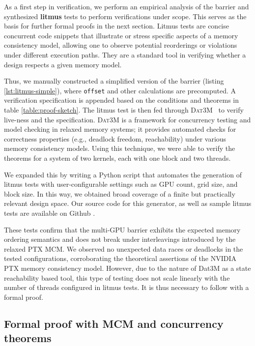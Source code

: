 \documentclass[acmsmall]{acmart}
\begin{document}
As a first step in verification, we perform an empirical analysis of the barrier and synthesized \textbf{litmus} tests to perform verifications under scope. This serves as the basis for further formal proofs in the next section. Litmus tests are concise concurrent code snippets that illustrate or stress specific aspects of a memory consistency model, allowing one to observe potential reorderings or violations under different execution paths. They are a standard tool in verifying whether a design respects a given memory model.

Thus, we manually constructed a simplified version of the barrier (listing \ref{lst:litmus-simple}), where \texttt{offset} and other calculations are precomputed. A verification specification is appended based on the conditions and theorems in table  \ref{table:proof-sketch}. The litmus test is then fed through \textsc{Dat3M}~\cite{unified-analysis} to verify live-ness and the specification. \textsc{Dat3M} is a framework for concurrency testing and model checking in relaxed memory systems; it provides automated checks for correctness properties (e.g., deadlock freedom, reachability) under various memory consistency models. Using this technique, we were able to verify the theorems for a system of two kernels, each with one block and two threads.

We expanded this by writing a Python script that automates the generation of litmus tests with user-configurable settings such as GPU count, grid size, and block size. In this way, we obtained broad coverage of a finite but practically relevant design space. Our source code for this generator, as well as sample litmus tests are available on Github \cite{gpubar}.

These tests confirm that the multi-GPU barrier exhibits the expected memory ordering semantics and does not break under interleavings introduced by the relaxed PTX MCM. We observed no unexpected data races or deadlocks in the tested configurations, corroborating the theoretical assertions of the NVIDIA PTX memory consistency model. However, due to the nature of Dat3M as a state reachability based tool, this type of testing does not scale linearly with the number of threads configured in litmus tests. It is thus necessary to follow with a formal proof.   

\subsection{Formal proof with MCM and concurrency theorems}
\label{sec:formal}
\end{document}
